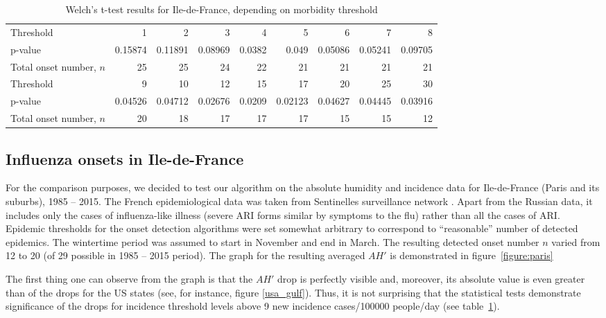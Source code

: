 \documentclass[3p,times,procedia]{elsarticle}
\begin{document}
\begin{table}[htbp]\small
	 \caption{Welch's t-test results for Ile-de-France, depending on morbidity threshold} \label{table:paris}
		\begin{tabular}{p{4cm}rrrrrrrr}
			\hline
			Threshold			& 1 & 2 & 3 & 4 & 5 & 6 & 7 & 8 \\
			p-value				& {\color{red}0.15874} & {\color{red}0.11891} & {\color{red}0.08969} & 0.0382 & 0.049 & {\color{red}0.05086} & {\color{red}0.05241} & {\color{red}0.09705} \\
			Total onset number, $n$	& 25 & 25 & 24 & 22 & 21 & 21 & 21 & 21 \\
			\hline\hline
			Threshold			& 9 & 10 & 12 & 15 & 17 &20 & 25 & 30 \\
			p-value				& 0.04526 & 0.04712 & 0.02676 & 0.0209 & 0.02123 & 0.04627 & 0.04445 & 0.03916 \\
			Total onset number, $n$	& 20 & 18 & 17 & 17 & 17 & 15 & 15 & 12 \\
			\hline
		\end{tabular}
\end{table}

\subsection{Influenza onsets in Ile-de-France}
For the comparison purposes, we decided to test our algorithm on the absolute humidity and incidence data for Ile-de-France (Paris and its suburbs), 1985 -- 2015. The French epidemiological data was taken from Sentinelles surveillance network \cite{sentinelles}. Apart from the Russian data, it includes only the cases of influenza-like illness (severe ARI forms similar by symptoms to the flu) rather than all the cases of ARI. Epidemic thresholds for the onset detection algorithms were set somewhat arbitrary to correspond to ``reasonable'' number of detected epidemics. The wintertime period was assumed to start in November and end in March. The resulting detected onset number $n$ varied from 12 to 20 (of 29 possible in 1985 -- 2015 period). The graph for the resulting averaged $AH'$ is demonstrated in figure~\ref{figure:paris}

The first thing one can observe from the graph is that the $AH'$ drop is perfectly visible and, moreover, its absolute value is even greater than of the drops for the US states (see, for instance, figure \ref{usa_gulf}). Thus, it is not surprising that the statistical tests demonstrate significance of the drops for incidence threshold levels above 9 new incidence cases/100000 people/day (see table~\ref{table:paris}).
\end{document}
